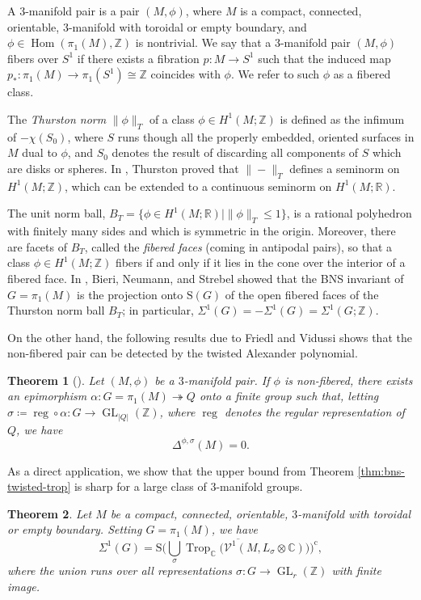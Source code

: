 \documentclass[11pt]{amsart}
\newtheorem{theorem}{Theorem}[section]
\theoremstyle{definition}
\newcommand{\Z}{\mathbb{Z}}
\newcommand{\R}{\mathbb{R}}
\newcommand{\C}{\mathbb{C}}
\newcommand{\VV}{\mathcal{V}}
\newcommand{\rS}{\mathrm{S}}
\DeclareMathOperator{\GL}{GL}
\DeclareMathOperator{\Hom}{{Hom}}
\DeclareMathOperator{\Trop}{Trop}
\DeclareMathOperator{\reg}{{reg}}
\newcommand{\surj}{\twoheadrightarrow}
\newcommand{\compl}{\mathrm{c}}
\begin{document}
A $3$-manifold pair is a pair $(M,\phi)$, where $M$ is a compact, connected, 
orientable, $3$-manifold with toroidal or empty boundary, and $\phi \in 
\Hom(\pi_1(M),\Z)$ is  nontrivial. We say that a $3$-manifold pair $(M,\phi)$ 
fibers over $S^1$ if there exists a fibration $p \colon M \to S^1$ such that the 
induced map $p_*\colon \pi_1(M) \to \pi_1(S^1)\cong \Z$ coincides with $\phi$. 
We refer to such $\phi$ as a fibered class.

The \emph{Thurston norm}\/ $\| \phi \|_T$ of a class 
$\phi\in H^1(M;\Z)$ is defined as the infimum of $-\chi(S_0)$, 
where $S$ runs though all the properly embedded, oriented 
surfaces in $M$  dual to $\phi$, and $S_0$ denotes 
the result of discarding all components of $S$ which 
are disks or spheres. In \cite{Th}, Thurston  proved that 
$\|-\|_T$ defines a seminorm on $H^1(M;\Z)$, which can 
be extended to a continuous seminorm on $H^1(M;\R)$.

The unit norm ball, $B_T=\{\phi\in H^1(M;\R) \mid \|\phi \|_T\leq 1\}$,
is a rational polyhedron with finitely many sides and which is symmetric 
in the origin. Moreover, there are facets of $B_T$, called the {\em fibered faces}\/ 
(coming in antipodal pairs), so that a class $\phi \in H^1(M;\Z)$ fibers if and 
only if it lies in the cone over the interior of a fibered face.
In \cite[Thm.~E]{BNS}, Bieri, Neumann, and Strebel showed that 
the BNS invariant of $G=\pi_1(M)$ is the projection onto $\rS(G)$ of 
the open fibered faces of the Thurston norm ball $B_T$; in particular, 
$\Sigma^1(G)=-\Sigma^1(G)=\Sigma^1(G;\Z)$. 

On the other hand, the following results due to Friedl and Vidussi \cite{FV13}
shows that the non-fibered pair can be detected by the 
twisted Alexander polynomial.

\begin{theorem}[{\cite[Thm.~1.1]{FV13}}]
\label{thm:Friedl-Vidussi}
Let $(M,\phi)$ be a $3$-manifold pair. If $\phi$ is non-fibered, there exists
an epimorphism $\alpha \colon G=\pi_1(M)\surj Q$ onto a finite group such that, 
letting $\sigma\coloneqq\reg \circ \alpha \colon G \to \GL_{|Q|}(\Z)$, 
where $\reg$ denotes the regular representation of $Q$, we have
\[
\Delta^{\phi,\sigma}(M)=0.
\]
\end{theorem}

As a direct application, we show that the upper bound from 
Theorem \ref{thm:bns-twisted-trop} is sharp for a large class 
of $3$-manifold groups.

\begin{theorem}
\label{thm:sigma-3mfd} 
Let $M$ be a compact, connected, orientable, $3$-manifold with toroidal 
or empty boundary. Setting $G=\pi_1(M)$, we have
\begin{equation}
\label{eq:sigma-3mfd}
\Sigma^1(G) = \rS\Bigg(\overline{\bigcup_{\sigma} 
\Trop_\C\big(\VV^1(M,L_{\sigma}\otimes \C)\big)}\Bigg)^{\compl},
\end{equation}
where the union runs over all representations 
$\sigma\colon G\to \GL_r(\Z)$ with finite image.
\end{theorem}
\end{document}

